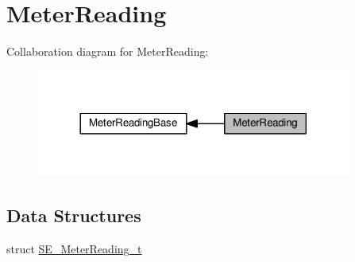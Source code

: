 \hypertarget{group__MeterReading}{}\section{Meter\+Reading}
\label{group__MeterReading}
Collaboration diagram for Meter\+Reading\+:\nopagebreak
\begin{figure}[H]
\begin{center}
\leavevmode
\includegraphics[width=293pt]{group__MeterReading}
\end{center}
\end{figure}
\subsection*{Data Structures}
\begin{DoxyCompactItemize}
\item 
struct \hyperlink{structSE__MeterReading__t}{S\+E\+\_\+\+Meter\+Reading\+\_\+t}
\end{DoxyCompactItemize}
